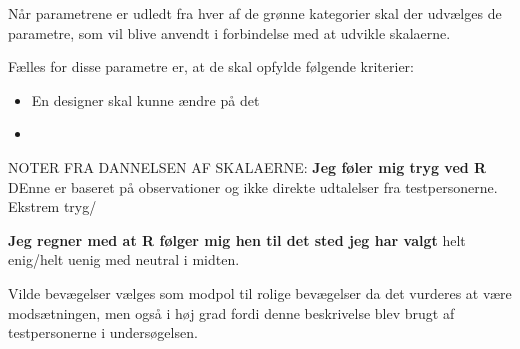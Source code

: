 




Når parametrene er udledt fra hver af de grønne kategorier skal der udvælges de parametre, som vil blive anvendt i forbindelse med at udvikle skalaerne. 

Fælles for disse parametre er, at de skal opfylde følgende kriterier: \blankline
%
\begin{itemize}
  \item En designer skal kunne ændre på det
  \item 
\end{itemize}



NOTER FRA DANNELSEN AF SKALAERNE:
\textbf{Jeg føler mig tryg ved R}
DEnne er baseret på observationer og ikke direkte udtalelser fra testpersonerne. 
Ekstrem tryg/

\textbf{Jeg regner med at R følger mig hen til det sted jeg har valgt} 
helt enig/helt uenig med neutral i midten. 

Vilde bevægelser vælges som modpol til rolige bevægelser da det vurderes at være modsætningen, men også i høj grad fordi denne beskrivelse blev brugt af testpersonerne i undersøgelsen. 

